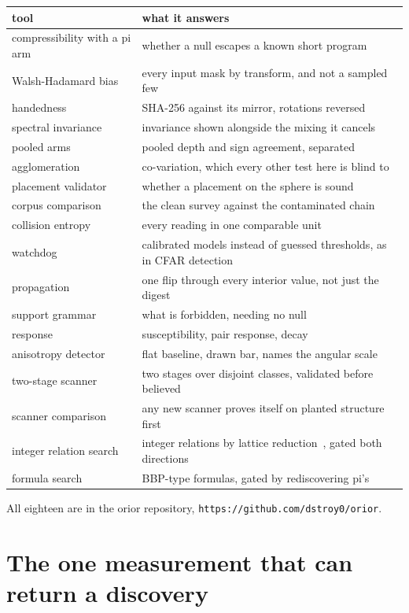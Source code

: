 \begin{center}
\begin{tabular}{@{}ll@{}}
\toprule
tool & what it answers \\
\midrule
compressibility with a pi arm & whether a null escapes a known short program \\
Walsh-Hadamard bias & every input mask by transform, and not a sampled few \\
handedness & SHA-256 against its mirror, rotations reversed \\
spectral invariance & invariance shown alongside the mixing it cancels \\
pooled arms & pooled depth and sign agreement, separated \\
agglomeration & co-variation, which every other test here is blind to \\
placement validator & whether a placement on the sphere is sound \\
corpus comparison & the clean survey against the contaminated chain \\
collision entropy & every reading in one comparable unit \\
watchdog & calibrated models instead of guessed thresholds, as in CFAR detection~\cite{src:Rohling-1983} \\
propagation & one flip through every interior value, not just the digest \\
support grammar & what is forbidden, needing no null \\
response & susceptibility, pair response, decay \\
anisotropy detector & flat baseline, drawn bar, names the angular scale \\
two-stage scanner & two stages over disjoint classes, validated before believed \\
scanner comparison & any new scanner proves itself on planted structure first \\
integer relation search & integer relations by lattice reduction~\cite{src:LLL-1982}, gated both directions \\
formula search & BBP-type formulas, gated by rediscovering pi's \\
\bottomrule
\end{tabular}
\end{center}

All eighteen are in the orior repository, \texttt{https://github.com/dstroy0/orior}.

\section{The one measurement that can return a discovery}

